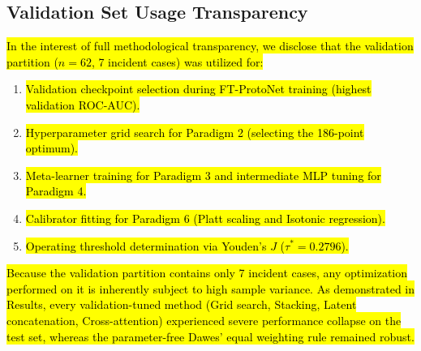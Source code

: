 \documentclass[10pt,letterpaper]{article}
\begin{document}
        \subsection*{Validation Set Usage Transparency}
        \hl{In the interest of full methodological transparency, we disclose that the validation partition ($n=62$, 7 incident cases) was utilized for:}
        \begin{enumerate}
            \item \hl{Validation checkpoint selection during FT-ProtoNet training (highest validation ROC-AUC).}
            \item \hl{Hyperparameter grid search for Paradigm 2 (selecting the 186-point optimum).}
            \item \hl{Meta-learner training for Paradigm 3 and intermediate MLP tuning for Paradigm 4.}
            \item \hl{Calibrator fitting for Paradigm 6 (Platt scaling and Isotonic regression).}
            \item \hl{Operating threshold determination via Youden's $J$ ($\tau^* = 0.2796$).}
        \end{enumerate}
        \hl{Because the validation partition contains only 7 incident cases, any optimization performed on it is inherently subject to high sample variance. As demonstrated in Results, every validation-tuned method (Grid search, Stacking, Latent concatenation, Cross-attention) experienced severe performance collapse on the test set, whereas the parameter-free Dawes' equal weighting rule remained robust.}
\end{document}
